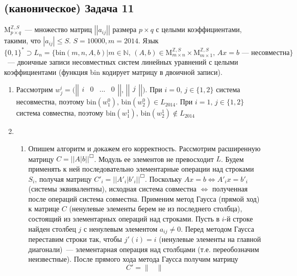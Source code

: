 \documentclass[a4paper]{article}
\newcommand{\matrixl}{\left|\left|}
\newcommand{\matrixr}{\right|\right|}
\begin{document}
\subsection*{(каноническое) Задача 11}
$\mbox{M}^{\mathbb{Z}, S}_{p\times q}$~--- множество матриц $\matrixl a_{ij} \matrixr$ размера $p\times q$ с целыми коэффициентами, такими, что $|a_{ij}|\leqslant S$. $S=10000, m=2014$. Язык $\{0,1\}^*\supset L_{n}=\{\mbox{bin}(m,n,A,b)\big|m\in\mathbb{N},\,(A,b)\in\mbox{M}^{\mathbb{Z}, S}_{m\times n}\times \mbox{M}^{\mathbb{Z}, S}_{m\times 1},\,Ax=b\mbox{~--- несовместна}\}$~--- двоичные записи несовместных систем линейных уравнений с целыми коэффициентами (функция bin кодирует матрицу в двоичной записи).
\begin{enumerate}
\item Рассмотрим $w^i_j=\big(\matrixl\begin{array}{cccc}
i & 0 & ... & 0\\
\end{array}\matrixr,\,\matrixl
\begin{array}{c}
j\\
\end{array}\matrixr\big)$. При $i=0,\,j\in\{1,2\}$ система несовместна, поэтому $\mbox{bin}(w^0_1),\,\mbox{bin}(w^0_2)\in L_{2014}$. При $i=1,\,j\in\{1,2\}$ система совместна, поэтому $\mbox{bin}(w^1_1),\,\mbox{bin}(w^1_2)\notin L_{2014}$
\item \begin{enumerate}
\item Опишем алгоритм и докажем его корректность. Рассмотрим расширенную матрицу $C={\matrixl A\big| b \matrixr}^{\Square}$. Модуль ее элементов не превосходит $L$. Будем применять к ней последовательно элементарные операции над строками $S_i$, получая матрицу $C'_i={\matrixl A'_i\big| b'_i \matrixr}^{\Square}$. Поскольку $Ax=b\Leftrightarrow A'_ix=b'_i$ (системы эквивалентны), исходная система совместна $\Leftrightarrow$ полученная после операций система совместна. Применим метод Гаусса (прямой ход) к матрице $C$ (ненулевые элементы берем не из последнего столбца), состоящий из элементарных операций над строками. Пусть в $i$-й строке найден столбец $j$ с ненулевым элементом $a_{ij}\neq 0$. Перед методом Гаусса переставим строки так, чтобы $j'(i)=i$ (ненулевые элементы на главной диагонали)~--- элементарная операция над столбцами (т.е. переобозначим неизвестные). После прямого хода метода Гаусса получим матрицу
$$C'=
\begin{Vmatrix}

\end{Vmatrix}$$
\end{enumerate}
\end{enumerate}
\end{document}
